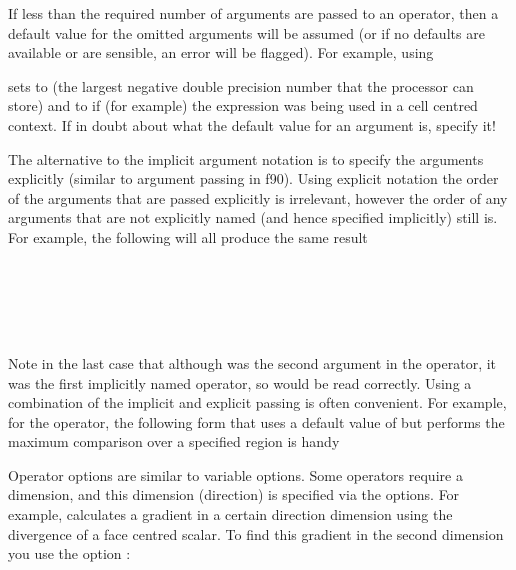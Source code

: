  
If less than the required number of arguments are passed to an operator, then a default value for the omitted arguments will be assumed (or if no defaults are available or are sensible, an error will be flagged).  For example, using
 
 
sets  to  (the largest negative double precision number that the processor can store) and  to  if (for example) the expression was being used in a cell centred context.  If in doubt about what the default value for an argument is, specify it!

The alternative to the implicit argument notation is to specify the arguments explicitly (similar to argument passing in f90).  Using explicit notation the order of the arguments that are passed explicitly is irrelevant, however the order of any arguments that are not explicitly named (and hence specified implicitly) still is.  For example, the following will all produce the same result
 
\\
\\
\\
\\
 
Note in the last case that although  was the second argument in the operator, it was the first implicitly named operator, so would be read correctly.  Using a combination of the implicit and explicit passing is often convenient.  For example, for the  operator, the following form that uses a default value of  but performs the maximum comparison over a specified region is handy
 

Operator options are similar to variable options.  Some operators require a dimension, and this dimension (direction) is specified via the options.  For example,  calculates a gradient in a certain direction dimension using the divergence of a face centred scalar.  To find this gradient in the second dimension you use the option \code{[l=2]}:

